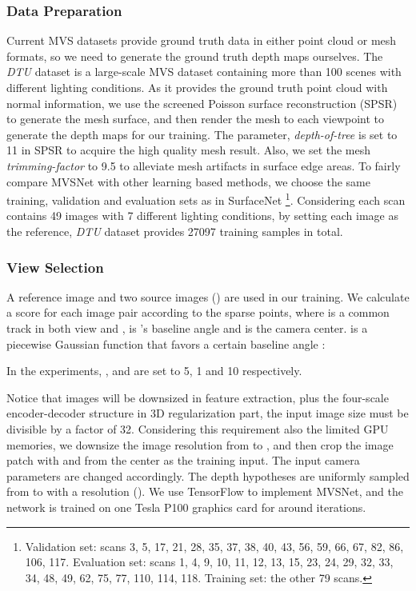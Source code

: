 \documentclass[runningheads]{llncs}
\begin{document}
\subsubsection{Data Preparation} Current MVS datasets provide ground truth data in either point cloud or mesh formats, so we need to generate the ground truth depth maps ourselves. The \textit{DTU} dataset \cite{aanaes2016large} is a large-scale MVS dataset containing more than 100 scenes with different lighting conditions. As it provides the ground truth point cloud with normal information, we use the screened Poisson surface reconstruction (SPSR) \cite{kazhdan2013screened} to generate the mesh surface, and then render the mesh to each viewpoint to generate the depth maps for our training. The parameter, \textit{depth-of-tree} is set to 11 in SPSR to acquire the high quality mesh result. Also, we set the mesh \textit{trimming-factor} to 9.5 to alleviate mesh artifacts in surface edge areas. To fairly compare MVSNet with other learning based methods, we choose the same training, validation and evaluation sets as in SurfaceNet \cite{ji2017surfacenet}\footnote{Validation set: scans 3, 5, 17, 21, 28, 35, 37, 38, 40, 43, 56, 59, 66, 67, 82, 86, 106, 117. Evaluation set: scans 1, 4, 9, 10, 11, 12, 13, 15, 23, 24, 29, 32, 33, 34, 48, 49, 62, 75, 77, 110, 114, 118. Training set: the other 79 scans.}. Considering each scan contains 49 images with 7 different lighting conditions, by setting each image as the reference, \textit{DTU} dataset provides 27097 training samples in total.
	
\vspace{-3mm}
\subsubsection{View Selection} A reference image and two source images () are used in our training. We calculate a score  for each image pair according to the sparse points, where  is a common track in both view  and ,  is 's baseline angle and  is the camera center.  is a piecewise Gaussian function \cite{zhang2015joint} that favors a certain baseline angle :

In the experiments, ,  and  are set to 5, 1 and 10 respectively. 

Notice that images will be downsized in feature extraction, plus the four-scale encoder-decoder structure in 3D regularization part, the input image size must be divisible by a factor of 32. Considering this requirement also the limited GPU memories, we downsize the image resolution from  to , and then crop the image patch with  and  from the center as the training input. The input camera parameters are changed accordingly. The depth hypotheses are uniformly sampled from  to  with a  resolution (). We use TensorFlow \cite{tensorflow2015-whitepaper} to implement MVSNet, and the network is trained on one Tesla P100 graphics card for around  iterations. 
\end{document}
